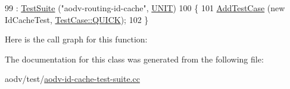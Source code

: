 \begin{DoxyCode}
99                       : \hyperlink{classns3_1_1TestSuite_a904b0c40583b744d30908aeb94636d1a}{TestSuite} (\textcolor{stringliteral}{"aodv-routing-id-cache"}, \hyperlink{classns3_1_1TestSuite_a1ebfcab34ec8161e085e8e3a1855eae0a3885375a3787abf60431f8454b3cadbd}{UNIT})
100   \{
101     \hyperlink{classns3_1_1TestCase_a3718088e3eefd5d6454569d2e0ddd835}{AddTestCase} (\textcolor{keyword}{new} IdCacheTest, \hyperlink{classns3_1_1TestCase_a11f6f57c21a0d32e605d192a89550f91ac2f47fb646e77f4ce7d662a69120965f}{TestCase::QUICK});
102   \}
\end{DoxyCode}


Here is the call graph for this function\+:




The documentation for this class was generated from the following file\+:\begin{DoxyCompactItemize}
\item 
aodv/test/\hyperlink{aodv-id-cache-test-suite_8cc}{aodv-\/id-\/cache-\/test-\/suite.\+cc}\end{DoxyCompactItemize}
